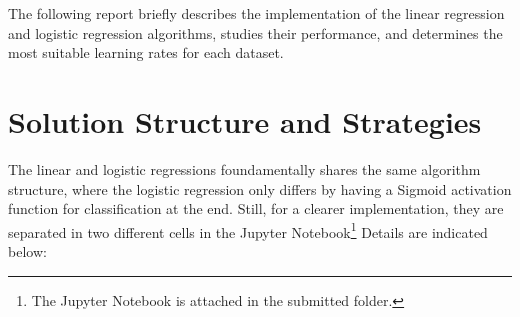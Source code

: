 \documentclass{article} %
\begin{document}
The following report briefly describes the implementation of the linear regression and logistic regression algorithms, studies their performance, and determines the most suitable learning rates for each dataset.


\vspace{0.3cm}
\section*{Solution Structure and Strategies} %
The linear and logistic regressions foundamentally shares the same algorithm structure, where the logistic regression only differs by having a Sigmoid activation function for classification at the end. Still, for a clearer implementation, they are separated in two different cells in the Jupyter Notebook\footnote{The Jupyter Notebook is attached in the submitted folder.} Details are indicated below:
\end{document}
